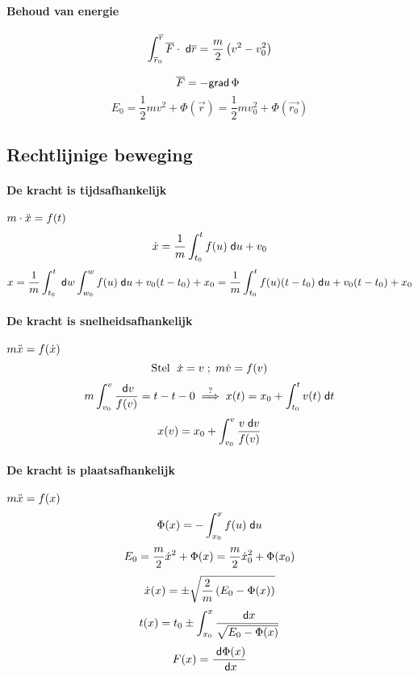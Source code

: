 \paragraph{Behoud van energie}
\[
  \int_{\overline{r}_0}^{\overline{r}} \overline{F} \cdot \;\textsf{d}\overline{r} = \frac{m}{2} \left( v^2 - v_0^2 \right)
\]

\[
  \overline{F} = - \textsf{grad}\,\Phi\;
\]
\[
  E_0 = \frac{1}{2} mv^2 + \Phi\left(\vec{r}\right)
      = \frac{1}{2} mv^2_0 + \Phi\left(\vec{r_0}\right)
\]

\subsection{Rechtlijnige beweging}
\label{sec:RechtlBew}

\paragraph{De kracht is tijdsafhankelijk} $m \cdot \ddot{x} = f(t)$
\[
  \dot{x} = \frac{1}{m} \int_{t_0}^{t} f(u) \;\textsf{d}u + v_0
\]
\[
  x = \frac{1}{m} \int_{t_0}^{t} \;\textsf{d}w \int_{w_0}^{w} f(u) \;\textsf{d}u + v_0(t - t_0) + x_0
    = \frac{1}{m} \int_{t_0}^{t} f(u) (t-t_0) \;\textsf{d}u + v_0(t-t_0) + x_0
\]  

\paragraph{De kracht is snelheidsafhankelijk} $m \ddot{x} =f(\dot{x})$
\[
  \mbox{Stel } 
  \;
  \dot{x} = v 
  \; ; \; 
  m\dot{v} = f(v)
\]
\[
  m \int_{v_0}^v \frac{\;\textsf{d}v}{f(v)} = t - t-0 
  \; \stackrel{?}{\mbox{$\Longrightarrow$}} \;
  x(t) = x_0 + \int_{t_0}^t v(t) \;\textsf{d}t
\]
\[
  x(v) = x_0 + \int_{v_0}^v \frac{v\;\textsf{d}v}{f(v)}
\]

\paragraph{De kracht is plaatsafhankelijk} $m \ddot{x} =f(x)$
\[
  \Phi(x) = - \int_{x_0}^x f(u) \;\textsf{d}u
\]
\[
  E_0 = \frac{m}{2} \dot{x}^2 + \Phi(x) = \frac{m}{2} \dot{x}_0^2 + \Phi(x_0)
\]
\[
  \dot{x}(x) = \pm \sqrt{\frac{2}{m} \left( E_0 - \Phi(x) \right)}
\]
\[
  t(x) = t_0 \pm \int_{x_0}^x \frac{\;\textsf{d}x}{\sqrt{E_0 - \Phi(x)}}
\]
\[
  F(x) = \frac{\;\textsf{d}\Phi(x)}{\;\textsf{d}x}
\]


